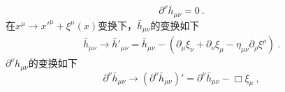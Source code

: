 \begin{equation}
\partial^\nu \bar h_{\mu\nu} = 0 ~. 
\end{equation}
在$x^\mu\rightarrow x'^\mu+\xi^\mu(x)$变换下，$\bar h_{\mu\nu}$的变换如下
\begin{align}
\bar h_{\mu\nu} \rightarrow \bar h'_{\mu\nu} = \bar h_{\mu\nu} - (\partial_\mu\xi_\nu+ \partial_\nu\xi_\mu - \eta_{\mu\nu} \partial_\rho\xi^\rho )~. 
\end{align}
$\partial^\nu h_{\mu\nu}$的变换如下
\begin{equation}
\partial^\nu \bar h_{\mu\nu} \rightarrow (\partial^\nu \bar h_{\mu\nu})' = \partial^\nu \bar h_{\mu\nu} - \Box \xi_\mu ~, 
\end{equation}









